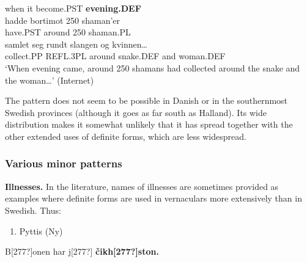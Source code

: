 when  it  become.PST  \textbf{evening.DEF} \\ %


\ea\label{}
\gll hadde  bortimot  250  shaman’er\\


have.PST  around  250  shaman.PL\\ %


\ea\label{}
\gll samlet  seg  rundt  slangen  og  kvinnen…\\


collect.PP  REFL.3PL  around  snake.DEF  and  woman.DEF\\ %


‘When evening came, around 250 shamans had collected around the snake and the woman…’ (Internet)
\z


The pattern does not seem to be possible in Danish or in the southernmost Swedish provinces (although it goes as far south as Halland). Its wide distribution makes it somewhat unlikely that it has spread together with the other extended uses of definite forms, which are less widespread. 

\subsubsection[Various minor patterns]{\rmfamily Various minor patterns}
\textbf{Illnesses.} In the literature, names of illnesses are sometimes provided as examples where definite forms are used in vernaculars more extensively than in Swedish. Thus: 

\begin{enumerate} %
\item 
Pyttis (Ny) 

\end{enumerate} %
\ea\label{}
\gll B[277?]onen  har  j[277?]  \textbf{čikh[277?]ston.}\\


